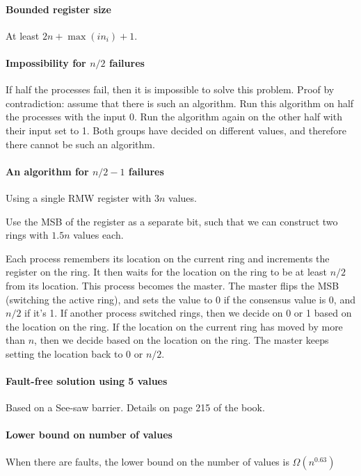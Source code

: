 \documentclass{idc_msc}
\begin{document}
\paragraph{Bounded register size}
At least $2n + \max(in_i) + 1$.

\paragraph{Impossibility for $n/2$ failures}
If half the processes fail, then it is impossible to solve this problem.
Proof by contradiction: assume that there is such an algorithm.
Run this algorithm on half the processes with the input 0.
Run the algorithm again on the other half with their input set to 1.
Both groups have decided on different values, and therefore there cannot be such an algorithm.

\paragraph{An algorithm for $n/2-1$ failures}
Using a single RMW register with $3n$ values.

Use the MSB of the register as a separate bit, such that we can construct two rings with $1.5n$ values each.

Each process remembers its location on the current ring and increments the register on the ring.
It then waits for the location on the ring to be at least $n/2$ from its location. This process becomes the master.
The master flips the MSB (switching the active ring), and sets the value to $0$ if the consensus value is 0, and $n/2$ if it's 1.
If another process switched rings, then we decide on 0 or 1 based on the location on the ring.
If the location on the current ring has moved by more than $n$, then we decide based on the location on the ring.
The master keeps setting the location back to 0 or $n/2$.

\paragraph{Fault-free solution using 5 values}
Based on a See-saw barrier. Details on page 215 of the book.

\paragraph{Lower bound on number of values}
When there are faults, the lower bound on the number of values is $\Omega(n^{0.63})$
\end{document}
